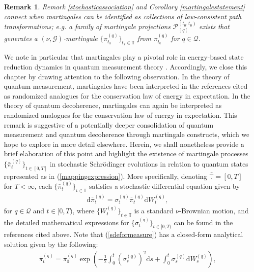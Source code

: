 \documentclass[12pt,a4paper]{article}
\newtheorem{rem}[thm]{Remark}
\newcommand{\Schrodinger}{{Schr\"odinger }}
\def\T{\mathbb{T}}
\def\dd{\mathrm{d}}
\def\G{\mathscr{G}}
\begin{document}
\begin{rem}
\label{finalremarkconnection}{\em
Remark \ref{stochasticassociation} and Corollary \ref{martingalestatement} connect when martingales can be identified as collections of law-consistent path transformations; e.g. a family of martingale projections $\mathcal{P}_{(q)}^{(t_0,t_0)}$ exists that generates a $(\nu,\G)$-martingale $\{\pi^{(q)}_{t_{k}}\}_{t_k\in\T}$ from $\pi^{(q)}_{t_{0}}$ for $q\in\mathcal{Q}$.}
\end{rem}

We note in particular that martingales play a pivotal role in energy-based state reduction dynamics in quantum measurement theory \cite{Gisin 1989, Adler et al 2001, Brody Hughston 2002, Menguturk 2016, Brody Hughston 2018, Menguturk Menguturk 2020, Brody Hughston 2023, Menguturk 2024}. Accordingly, we close this chapter by drawing attention to the following observation. In the theory of quantum measurement, martingales have been interpreted in the references cited as randomized analogues for the conservation law of energy in expectation. In the theory of quantum decoherence, martingales can again be interpreted as randomized analogues for the conservation law of energy in expectation. This remark is suggestive of a potentially deeper consolidation of quantum measurement and quantum decoherence through martingale constructs, which we hope to explore in more detail elsewhere. Herein, we shall nonetheless provide a brief elaboration of this point and highlight the existence of martingale processes $\{\bar{\pi}^{(q)}_{t}\}_{t\in[0,T]}$ in stochastic \Schrodinger evolutions in relation to quantum states represented as in (\ref{mappingexpression}). More specifically, denoting $\bar{\T} = [0,T]$ for $T < \infty$, each $\{\bar{\pi}^{(q)}_{t}\}_{t\in\bar{\T}}$ satisfies a stochastic differential equation given by 
\begin{align}
\dd\bar{\pi}^{(q)}_{t} = \sigma^{(q)}_{t}\bar{\pi}^{(q)}_{t}\dd W^{(q)}_t, \label{sdeformeasure}
\end{align}
for $q\in\mathcal{Q}$ and $t\in[0,T)$, where $\{W^{(q)}_t\}_{t\in\T}$ is a standard $\nu$-Brownian motion, and the detailed mathematical expressions for $\{\sigma^{(q)}_t\}_{t\in[0,T)}$ can be found in the references cited above. Note that (\ref{sdeformeasure}) has a closed-form analytical solution given by the following:
\begin{align}
\label{exponentialmartingalerep}
\bar{\pi}^{(q)}_{t} = \bar{\pi}^{(q)}_{0}\exp\left(- \frac{1}{2}\int_0^t \left(\sigma^{(q)}_{s}\right)^2\dd s + \int_0^t \sigma^{(q)}_{s}\dd W^{(q)}_s \right),
\end{align}
\end{document}
